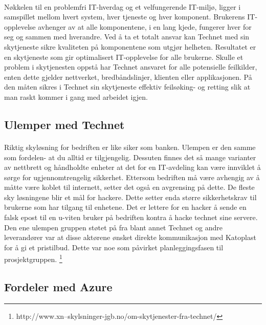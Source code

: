 \paragraph{} Nøkkelen til en problemfri IT-hverdag og et velfungerende IT-miljø, ligger i samspillet mellom hvert system, hver tjeneste og hver komponent. Brukerens IT-opplevelse avhenger av at alle komponentene, i en lang kjede, fungerer hver for seg og sammen med hverandre. Ved å ta et totalt ansvar kan Technet med sin skytjeneste sikre kvaliteten på komponentene som utgjør helheten. Resultatet er en skytjeneste som gir optimalisert IT-opplevelse for alle brukerne. Skulle et problem i skytjenesten oppstå har Technet ansvaret for alle potensielle feilkilder, enten dette gjelder nettverket, bredbåndslinjer, klienten eller applikasjonen. På den måten sikres i Technet sin skytjeneste effektiv feilsøking- og retting slik at man raskt kommer i gang med arbeidet igjen.


\subsection{Ulemper med Technet}
\paragraph{}Riktig skyløsning for bedriften er like siker som banken. Ulempen er den samme som fordelen- at du alltid er tilgjengelig. Dessuten finnes det så mange varianter av nettbrett og håndholdte enheter at det for en IT-avdeling kan være innviklet å sørge for ugjennomtrengelig sikkerhet. Ettersom bedriften må være avhengig av å måtte være koblet til internett, setter det også en avgrensing på dette. De fleste sky løsningene blir et mål for hackere. Dette setter enda større sikkerhetskrav til brukerne som har tilgang til enhetene. Det er lettere for en hacker å sende en falsk epost til en u-viten bruker på bedriften kontra å hacke technet sine servere. Den ene ulempen gruppen støtet på fra blant annet Technet og andre leverandører var at disse aktørene ønsket direkte kommunikasjon med Katoplast for å gi et pristilbud. Dette var noe som påvirket planleggingsfasen til prosjektgruppen.
\footnote{http://www.xn--skylsninger-jgb.no/om-skytjenester-fra-technet/}


\subsection{Fordeler med Azure}

